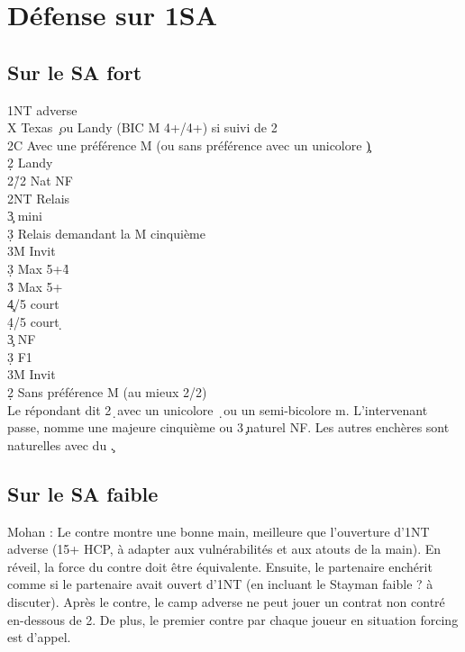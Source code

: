 \documentclass[a4paper]{article}
\begin{document}
\section{Défense sur 1SA}

\subsection{Sur le SA fort}

\begin{bidtable}
1NT \> adverse\+\\
X \> Texas \c\ ou Landy (BIC M 4+/4+) si suivi de 2\d \\
\>2C Avec une préférence M (ou sans préférence avec un unicolore \c )\+\\
2\d \> Landy\+\\
2\h/2\s \> Nat NF\\
2NT \> Relais\+\\
3\c \> mini\+\\
3\d \> Relais demandant la M cinquième\\
3M \> Invit\-\\
3\d \> Max 5+\h 4\s \\
3\h \> Max 5+\h \\
4\c {}/5 court \c \\
4\d {}/5 court \d \-\\
3\c \> NF\\
3\d \> F1\\
3M \> Invit\-\\
2\d \> Sans préférence M (au mieux 2/2)\+\\
Le \> répondant dit 2\d\ avec un unicolore \d\ ou un semi-bicolore m. L'intervenant passe, nomme une majeure cinquième ou 3\c\ naturel NF. Les autres enchères sont naturelles avec du \c .\-\-\-
\end{bidtable}

\subsection{Sur le SA faible}

Mohan : Le contre montre une bonne main, meilleure que l'ouverture d'1NT adverse (15+ HCP, à adapter aux vulnérabilités et aux atouts de la main). En réveil, la force du contre doit être équivalente.
Ensuite, le partenaire enchérit comme si le partenaire avait ouvert d'1NT (en incluant le Stayman faible ? à discuter).
Après le contre, le camp adverse ne peut jouer un contrat non contré en-dessous de 2\s . De plus, le premier contre par chaque joueur en situation forcing est d'appel.
\end{document}
